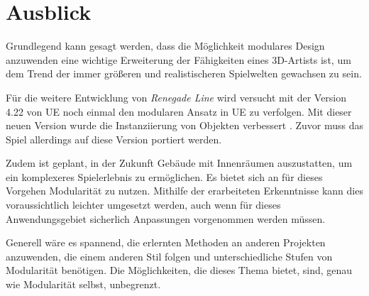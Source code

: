 \section{Ausblick}
Grundlegend kann gesagt werden, dass die Möglichkeit modulares Design anzuwenden eine wichtige Erweiterung der Fähigkeiten eines 3D-Artists ist, um dem Trend der immer größeren und realistischeren Spielwelten gewachsen zu sein.
\par
Für die weitere Entwicklung von \textit{Renegade Line} wird versucht mit der Version 4.22 von UE noch einmal den modularen Ansatz in UE zu verfolgen. Mit dieser neuen Version wurde die Instanziierung von Objekten verbessert \parencite{unrealTalk}. Zuvor muss das Spiel allerdings auf diese Version portiert werden.
\par
Zudem ist geplant, in der Zukunft Gebäude mit Innenräumen auszustatten, um ein komplexeres Spielerlebnis zu ermöglichen. Es bietet sich an für dieses Vorgehen Modularität zu nutzen. Mithilfe der erarbeiteten Erkenntnisse kann dies voraussichtlich leichter umgesetzt werden, auch wenn für dieses Anwendungsgebiet sicherlich Anpassungen vorgenommen werden müssen.
\par
Generell wäre es spannend, die erlernten Methoden an anderen Projekten anzuwenden, die einem anderen Stil folgen und unterschiedliche Stufen von Modularität benötigen. Die Möglichkeiten, die dieses Thema bietet, sind, genau wie Modularität selbst, unbegrenzt.